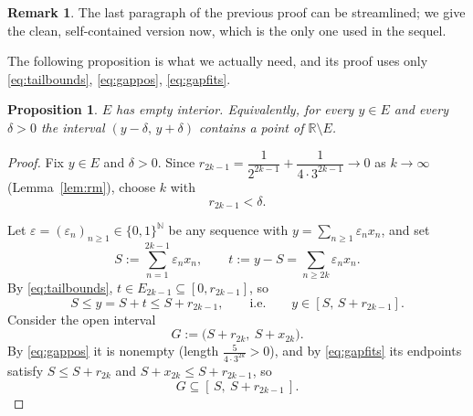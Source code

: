\documentclass{amsart}
\newtheorem{proposition}{Proposition}
\theoremstyle{definition}
\newtheorem*{remark}{Remark}
\begin{document}
\begin{remark}
The last paragraph of the previous proof can be streamlined; we give the clean,
self-contained version now, which is the only one used in the sequel.
\end{remark}

The following proposition is what we actually need, and its proof uses only
\eqref{eq:tailbounds}, \eqref{eq:gappos}, \eqref{eq:gapfits}.

\begin{proposition}\label{prop:nointerior}
$E$ has empty interior. Equivalently, for every $y\in E$ and every $\delta>0$ the interval
$(y-\delta,\,y+\delta)$ contains a point of $\mathbb R\setminus E$.
\end{proposition}

\begin{proof}
Fix $y\in E$ and $\delta>0$. Since $r_{2k-1}=\dfrac{1}{2^{2k-1}}+\dfrac{1}{4\cdot 3^{2k-1}}\to 0$
as $k\to\infty$ (Lemma~\ref{lem:rm}), choose $k$ with
\begin{equation}\label{eq:choosek}
r_{2k-1}<\delta .
\end{equation}

Let $\varepsilon=(\varepsilon_n)_{n\ge1}\in\{0,1\}^{\mathbb N}$ be any sequence with
$y=\sum_{n\ge1}\varepsilon_n x_n$, and set
$$S:=\sum_{n=1}^{2k-1}\varepsilon_n x_n,\qquad t:=y-S=\sum_{n\ge 2k}\varepsilon_n x_n .$$
By \eqref{eq:tailbounds}, $t\in E_{2k-1}\subseteq[0,r_{2k-1}]$, so
\begin{equation}\label{eq:yinbranch}
S\le y=S+t\le S+r_{2k-1},\qquad\text{i.e.}\qquad y\in[S,\,S+r_{2k-1}] .
\end{equation}
Consider the open interval
$$G:=\big(S+r_{2k},\ S+x_{2k}\big).$$
By \eqref{eq:gappos} it is nonempty (length $\tfrac{5}{4\cdot3^{2k}}>0$), and by
\eqref{eq:gapfits} its endpoints satisfy $S\le S+r_{2k}$ and $S+x_{2k}\le S+r_{2k-1}$, so
\begin{equation}\label{eq:Ginbranch}
G\subseteq[\,S,\ S+r_{2k-1}\,].
\end{equation}


\end{proof}
\end{document}
